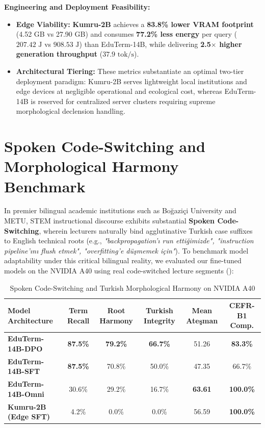 \documentclass[a4paper,12pt]{report}
\begin{document}
\textbf{Engineering and Deployment Feasibility:}
\begin{itemize}
    \item \textbf{Edge Viability:} \textbf{Kumru-2B} achieves a \textbf{83.8\% lower VRAM footprint} (4.52 GB vs 27.90 GB) and consumes \textbf{77.2\% less energy} per query ($207.42\text{ J}$ vs $908.53\text{ J}$) than EduTerm-14B, while delivering \textbf{2.5$\times$ higher generation throughput} ($37.9\text{ tok/s}$).
    \item \textbf{Architectural Tiering:} These metrics substantiate an optimal two-tier deployment paradigm: Kumru-2B serves lightweight local institutions and edge devices at negligible operational and ecological cost, whereas EduTerm-14B is reserved for centralized server clusters requiring supreme morphological declension handling.
\end{itemize}



\section{Spoken Code-Switching and Morphological Harmony Benchmark}
\label{sec:code_switching_benchmark}
In premier bilingual academic institutions such as Bo\u{g}azi\c{c}i University and METU, STEM instructional discourse exhibits substantial \textbf{Spoken Code-Switching}, wherein lecturers naturally bind agglutinative Turkish case suffixes to English technical roots (e.g., \textit{"backpropagation'ı run etti\u{g}imizde", "instruction pipeline'ını flush etmek", "overfitting'e d\"{u}\c{s}memek i\c{c}in"}). To benchmark model adaptability under this critical bilingual reality, we evaluated our fine-tuned models on the NVIDIA A40 using real code-switched lecture segments ():

\begin{table}[htbp]
\centering
\small
\caption{Spoken Code-Switching and Turkish Morphological Harmony on NVIDIA A40}
\label{tab:code_switching_benchmark}
\scriptsize\setlength{\tabcolsep}{2pt}
\begin{tabularx}{\textwidth}{>{\RaggedRight\arraybackslash}Xccccc}
\hline
\textbf{Model Architecture} & \textbf{Term Recall} & \textbf{Root Harmony} & \textbf{Turkish Integrity} & \textbf{Mean Ate\c{s}man} & \textbf{CEFR-B1 Comp.} \\
\hline
\textbf{EduTerm-14B-DPO} & \textbf{87.5\%} & \textbf{79.2\%} & \textbf{66.7\%} & 51.26 & \textbf{83.3\%} \\
\textbf{EduTerm-14B-SFT} & \textbf{87.5\%} & 70.8\% & 50.0\% & 47.35 & 66.7\% \\
\textbf{EduTerm-14B-Omni} & 30.6\% & 29.2\% & 16.7\% & \textbf{63.61} & \textbf{100.0\%} \\
\textbf{Kumru-2B (Edge SFT)} & 4.2\% & 0.0\% & 0.0\% & 56.59 & \textbf{100.0\%} \\
\hline
\end{tabularx}
\end{table}
\end{document}
